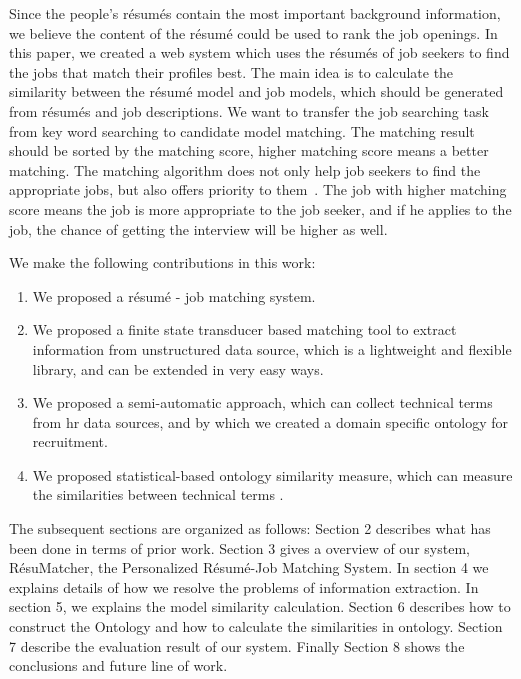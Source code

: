 Since the people's r\'esum\'es contain the most important background information, we believe the content of the r\'esum\'e could be used to rank the job openings. In this paper, we created a web system which uses the r\'esum\'es of job seekers to find the jobs that match their profiles best. The main idea is to calculate the similarity between the r\'esum\'e model and job models, which should be generated from r\'esum\'es and job descriptions. We want to transfer the job searching task from key word searching to candidate model matching. The matching result should be sorted by the matching score, higher matching score means a better matching. The matching algorithm does not only help job seekers to find the appropriate jobs, but also offers priority to them~\cite{gueutal2006brave}.  The job with higher matching score means the job is more appropriate to the job seeker, and if he applies to the job, the chance of getting the interview will be higher as well.

We make the following contributions in this work:

\begin{enumerate}
    \item  We proposed a r\'esum\'e - job matching system.
    \item  We proposed a finite state transducer based matching tool to extract information from unstructured data source, which is a lightweight and flexible library, and can be extended in very easy ways.
    \item  We proposed a semi-automatic approach, which can collect technical terms from hr data sources, and by which we created a domain specific ontology for recruitment.
    \item  We proposed statistical-based ontology similarity measure, which can measure the similarities between technical terms .
\end{enumerate}

The subsequent sections are organized as follows: Section 2 describes what has been done in terms of prior work. Section 3 gives a overview of our system, R\'esuMatcher, the Personalized R\'esum\'e-Job Matching System. In section 4 we explains details of how we resolve the problems of information extraction. In section 5, we explains the model similarity calculation. Section 6 describes how to construct the Ontology and how to calculate the similarities in ontology. Section 7 describe the evaluation result of our system. Finally Section 8 shows the conclusions and future line of work.
